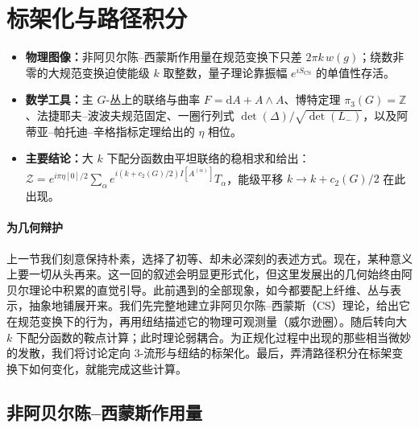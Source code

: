 \documentclass[11pt,a4paper]{article}
\newcommand{\Z}{\mathbb{Z}}
\newcommand{\dd}{\mathrm{d}}
\newcommand{\SCS}{S_{\mathrm{CS}}}
\newcounter{yizhu}
\newif\ifshowkey
\newenvironment{keytakeaways}{%
    \par\medskip
    \ifshowkey
    \begin{tcolorbox}[enhanced,
        colback=blue!3!white, colframe=blue!35!black,
        boxrule=0.5pt, arc=2pt, left=6pt, right=6pt, top=4pt, bottom=4pt,
        title={\small\textbf{本节重点}\quad{\footnotesize（译者所加）}},
        fonttitle=\bfseries, coltitle=black, colbacktitle=blue!10!white,
        toptitle=1pt, bottomtitle=1pt]
    \else
        \setbox\yizhubox\vbox\bgroup
    \fi
}{%
    \ifshowkey
        \end{tcolorbox}%
    \else
        \egroup
    \fi
    \par\medskip
}
\begin{document}
\section{标架化与路径积分}\label{sec:3}

\begin{keytakeaways}
\begin{itemize}[leftmargin=1.4em,itemsep=2pt,topsep=2pt]
  \item \textbf{物理图像：}非阿贝尔陈--西蒙斯作用量在规范变换下只差 $2\pi k\,w(g)$；绕数非零的大规范变换迫使能级 $k$ 取整数，量子理论靠振幅 $e^{i\SCS}$ 的单值性存活。
  \item \textbf{数学工具：}主 $G$-丛上的联络与曲率 $F=\dd A+A\wedge A$、博特定理 $\pi_3(G)=\Z$、法捷耶夫--波波夫规范固定、一圈行列式 $\det(\Delta)/\sqrt{\det(L_-)}$，以及阿蒂亚--帕托迪--辛格指标定理给出的 $\eta$ 相位。
  \item \textbf{主要结论：}大 $k$ 下配分函数由平坦联络的稳相求和给出：$\mathcal{Z}=e^{i\pi\eta[0]/2}\sum_\alpha e^{i(k+c_2(G)/2)I[A^{(\alpha)}]}T_\alpha$，能级平移 $k\to k+c_2(G)/2$ 在此出现。
\end{itemize}
\end{keytakeaways}

\paragraph{为几何辩护}
上一节我们刻意保持朴素，选择了初等、却未必深刻的表述方式。现在，某种意义上要一切从头再来。这一回的叙述会明显更形式化，但这里发展出的几何始终由阿贝尔理论中积累的直觉引导。此前遇到的全部现象，如今都要配上纤维、丛与表示，抽象地铺展开来。我们先完整地建立非阿贝尔陈--西蒙斯（CS）理论，给出它在规范变换下的行为，再用纽结描述它的物理可观测量（威尔逊圈）。随后转向大 $k$ 下配分函数的鞍点计算；此时理论弱耦合。为正规化过程中出现的那些相当微妙的发散，我们将讨论定向 3-流形与纽结的标架化。最后，弄清路径积分在标架变换下如何变化，就能完成这些计算。

\subsection{非阿贝尔陈--西蒙斯作用量}\label{sec:3.1}
\end{document}
